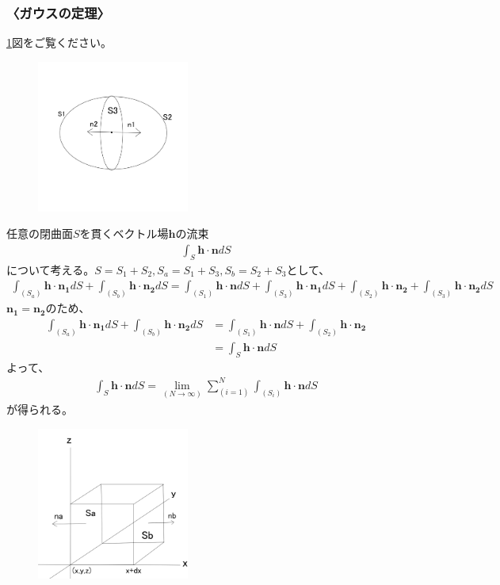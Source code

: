 \documentclass[10pt,b5paper,papersize,dvipdfmx]{jsbook}
\begin{document}
\subsubsection{〈ガウスの定理〉}
\ref{fig:Gauss1}図をご覧ください。
\begin{figure}[htbp]
  \begin{flushright}
  \includegraphics[width=5cm]{img/Gauss}
  \caption{}
  \label{fig:Gauss1}
  \end{flushright}
\end{figure}
任意の閉曲面$S$を貫くベクトル場$\mathbf{h}$の流束
\begin{align}
\int_S \mathbf{h}\cdot\mathbf{n}dS
\end{align}
について考える。$S=S_1 +S_2 ,S_a =S_1 +S_3 ,S_b =S_2 +S_3$として、
\begin{align}
\int_(S_a) \mathbf{h}\cdot\mathbf{n_1}dS+\int_(S_b) \mathbf{h}\cdot\mathbf{n_2}dS = \int_(S_1) \mathbf{h}\cdot\mathbf{n}dS + \int_(S_3) \mathbf{h}\cdot\mathbf{n_1}dS + \int_(S_2) \mathbf{h}\cdot\mathbf{n_2} + \int_(S_3) \mathbf{h}\cdot\mathbf{n_2}dS 
\end{align}
$\mathbf{n_1} = \mathbf{n_2}$のため、
\begin{align}
\int_(S_a) \mathbf{h}\cdot\mathbf{n_1}dS+\int_(S_b) \mathbf{h}\cdot\mathbf{n_2}dS 
&= \int_(S_1) \mathbf{h}\cdot\mathbf{n}dS + \int_(S_2) \mathbf{h}\cdot\mathbf{n_2}\\
&= \int_S \mathbf{h}\cdot\mathbf{n}dS
\end{align}
よって、
\begin{align}
\int_S \mathbf{h}\cdot\mathbf{n}dS = \lim_(N \to \infty)\sum_(i=1)^N \int_(S_i) \mathbf{h}\cdot\mathbf{n}dS
\end{align}
が得られる。
\begin{figure}[htbp]
  \begin{flushright}
  \includegraphics[width=5cm]{img/Gauss2}
  \caption{}
  \label{fig:Gauss2}
  \end{flushright}
\end{figure}
\end{document}
